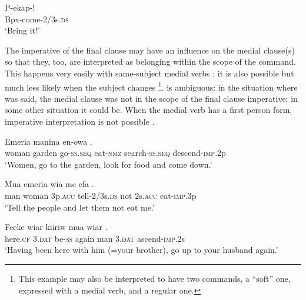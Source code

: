 \ea%
\label{ex:7:x1084}
\gll P-ekap-! \\
Bpx-come-2/3s.\textsc{ds}      \\
\glt `Bring it!'
\z

The imperative of the final clause may have an influence on the medial clause(s) so that they, too, are interpreted as belonging within the scope of the command. This happens very easily with same-subject medial verbs ; it is also possible but much less likely when the subject changes \footnote{This example may also be interpreted to have two commands, a ``soft'' one, expressed with a medial verb, and a regular one.}.  is ambiguous: in the situation where was said, the medial clause was not in the scope of the final clause imperative; in some other situation it could be. When the medial verb has a first person form, imperative interpretation is not possible . 

\ea%
\label{ex:7:x1082}
\gll Emeria  manina    en-owa    . \\
woman  garden  go-\textsc{ss}.\textsc{seq}  eat-\textsc{nmz}  search-\textsc{ss}.\textsc{seq}  descend-\textsc{imp}.2p      \\
\glt `Women, go to the garden, look for food and come down.'
\z





\ea%
\label{ex:7:x1364}
\gll Mua  emeria  wia    me  efa  . \\
man  woman  3p.\textsc{acc}  tell-2/3s.\textsc{ds}  not  2s.\textsc{acc}  eat-\textsc{imp}.3p      \\
\glt `Tell the people and let them not eat me.'
\z





\ea%
\label{ex:7:x1846}
\gll Feeke  wiar    kiiriw  mua  wiar  . \\
here.\textsc{cf}  3.\textsc{dat}  be-\textsc{ss}  again  man  3.\textsc{dat}  ascend-\textsc{imp}.2s      \\
\glt `Having been here with him (=your brother), go up to your husband again.'
\z





